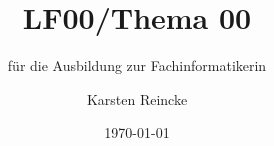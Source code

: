 \documentclass[]{beamer}
\title{LF00/Thema 00}
\subtitle{für die Ausbildung zur Fachinformatikerin}
\institute{GS-LDK}
\author{Karsten Reincke}
\date{\today}
\def\cfgGl{../../../cfg.gl/}
\begin{document}
\begin{frame}
  \titlepage
\end{frame}




\end{document}

